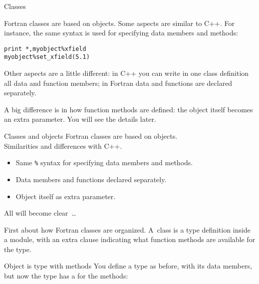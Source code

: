 
 {Classes}
\label{sec:objectf}

Fortran classes are based on  objects.
Some aspects are similar to C++.
For instance,
the same syntax is used for specifying data members and methods:
\begin{lstlisting}
print *,myobject%xfield
myobject%set_xfield(5.1)
\end{lstlisting}

Other aspects are a little different:
in C++ you can write in one class definition
all data and function members;
in Fortran 
data and functions are declared separately.

A big difference is in how function methods are defined:
the object itself becomes an extra parameter.
You will see the details later.

\begin{slide}{Classes and objects}
  \label{sl:fclass}
  Fortran classes are based on  objects.\\
  Similarities and differences with C++.
  \begin{itemize}
  \item
    Same \lstinline+%+
    syntax for specifying data members and methods.
  \item Data members and functions declared separately.
  \item Object itself as extra parameter.
  \end{itemize}
  All will become clear~\ldots
\end{slide}

First about how Fortran classes are organized.
A~class is a type definition inside a module,
with an extra clause indicating what function methods
are available for the type.

\begin{block}{Object is type with methods}
  \label{sl:fclass-type}
  You define a type as before, with its data members, but now the type
  has a  for the
  methods:
  \footnotesize
\end{block}

